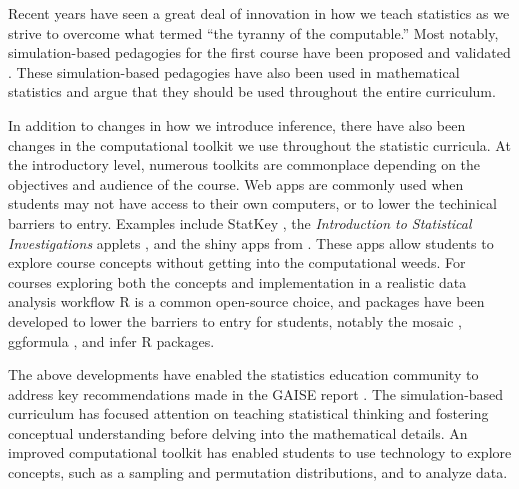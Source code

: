 \documentclass[12pt]{article}
\begin{document}
Recent years have seen a great deal of innovation in how we teach
statistics as we strive to overcome what \citet{Cobb-2007uo} termed
``the tyranny of the computable.'' Most notably, simulation-based
pedagogies for the first course have been proposed and validated
\citep{Cobb-2007uo, Tintle-2011vo, Tintle-2012td, Maurer-2014te, Tintle2014-vt, Hildreth2018}.
These simulation-based pedagogies have also been used in mathematical
statistics \citep{chihara2011, Cobb2011-vz} and \citet{Tintle2015-yv}
argue that they should be used throughout the entire curriculum.

In addition to changes in how we introduce inference, there have also
been changes in the computational toolkit we use throughout the
statistic curricula. At the introductory level, numerous toolkits are
commonplace depending on the objectives and audience of the course. Web
apps are commonly used when students may not have access to their own
computers, or to lower the techinical barriers to entry. Examples
include StatKey \citep{Lock2017}, the \emph{Introduction to Statistical
Investigations} applets \citep{tintle2015}, and the shiny apps from
\citet{agresti2017}. These apps allow students to explore course
concepts without getting into the computational weeds. For courses
exploring both the concepts and implementation in a realistic data
analysis workflow R \citep{r} is a common open-source choice, and
packages have been developed to lower the barriers to entry for
students, notably the mosaic \citep{Pruim2017-uc}, ggformula
\citep{ggformula}, and infer \citep{infer} R packages.

The above developments have enabled the statistics education community
to address key recommendations made in the GAISE report
\citep{gaise2016}. The simulation-based curriculum has focused attention
on teaching statistical thinking and fostering conceptual understanding
before delving into the mathematical details. An improved computational
toolkit has enabled students to use technology to explore concepts, such
as a sampling and permutation distributions, and to analyze data.
\end{document}
